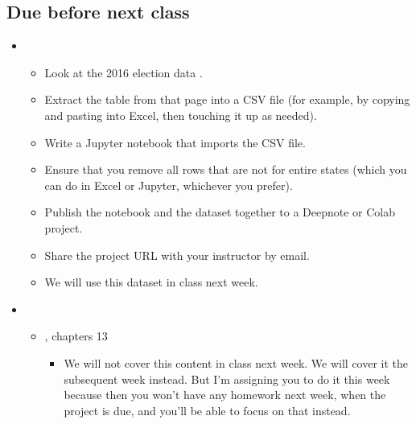 \documentclass[letterpaper,10pt,english]{sphinxmanual}
\begin{document}
\subsection{Due before next class}
\label{\detokenize{course-schedule:id8}}\begin{itemize}
\item {} 
\begin{itemize}
\item {} 
Look at the 2016 election data .

\item {} 
Extract the table from that page into a CSV file (for example, by copying and pasting into Excel, then touching it up as needed).

\item {} 
Write a Jupyter notebook that imports the CSV file.

\item {} 
Ensure that you remove all rows that are not for entire states (which you can do in Excel or Jupyter, whichever you prefer).

\item {} 
Publish the notebook and the dataset together to a Deepnote or Colab project.

\item {} 
Share the project URL with your instructor by email.

\item {} 
We will use this dataset in class next week.

\end{itemize}

\item {} 
\begin{itemize}
\item {} 
, chapters 1\sphinxhyphen{}3
\begin{itemize}
\item {} 
 We will not cover this content in class next week.  We will cover it the subsequent week instead.  But I’m assigning you to do it this week because then you won’t have any homework next week, when the project is due, and you’ll be able to focus on that instead.

\end{itemize}


\end{itemize}
\end{itemize}
\end{document}
